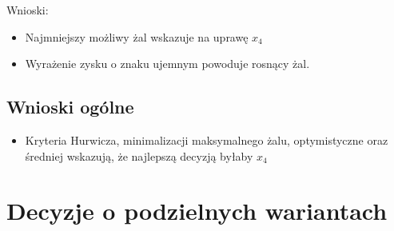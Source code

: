 \documentclass{article}
\begin{document}
Wnioski:

\begin{itemize}
  \item Najmniejszy możliwy żal wskazuje na uprawę $x_4$
  \item Wyrażenie zysku o znaku ujemnym powoduje rosnący żal.
\end{itemize}

\subsection{Wnioski ogólne}

\begin{itemize}
  \item Kryteria Hurwicza, minimalizacji maksymalnego żalu, optymistyczne oraz średniej wskazują, że najlepszą decyzją byłaby $x_4$
\end{itemize}




\section{Decyzje o podzielnych wariantach}
\end{document}
